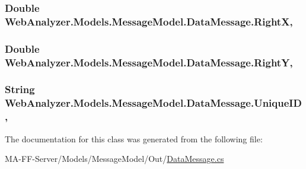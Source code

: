 \subsubsection[{Right\+X}]{\setlength{\rightskip}{0pt plus 5cm}Double Web\+Analyzer.\+Models.\+Message\+Model.\+Data\+Message.\+Right\+X\hspace{0.3cm}{\ttfamily [get]}, {\ttfamily [set]}}\label{class_web_analyzer_1_1_models_1_1_message_model_1_1_data_message_ab650b2ca778810b8a6fbd0d7530318a9}
\hypertarget{class_web_analyzer_1_1_models_1_1_message_model_1_1_data_message_a3b554f231e24414cfa625552ff2635df}{}
\subsubsection[{Right\+Y}]{\setlength{\rightskip}{0pt plus 5cm}Double Web\+Analyzer.\+Models.\+Message\+Model.\+Data\+Message.\+Right\+Y\hspace{0.3cm}{\ttfamily [get]}, {\ttfamily [set]}}\label{class_web_analyzer_1_1_models_1_1_message_model_1_1_data_message_a3b554f231e24414cfa625552ff2635df}
\hypertarget{class_web_analyzer_1_1_models_1_1_message_model_1_1_data_message_af8ea083fd4035d8c786f5da12bc01917}{}
\subsubsection[{Unique\+I\+D}]{\setlength{\rightskip}{0pt plus 5cm}String Web\+Analyzer.\+Models.\+Message\+Model.\+Data\+Message.\+Unique\+I\+D\hspace{0.3cm}{\ttfamily [get]}, {\ttfamily [set]}}\label{class_web_analyzer_1_1_models_1_1_message_model_1_1_data_message_af8ea083fd4035d8c786f5da12bc01917}


The documentation for this class was generated from the following file\+:\begin{DoxyCompactItemize}
\item 
M\+A-\/\+F\+F-\/\+Server/\+Models/\+Message\+Model/\+Out/\hyperlink{_data_message_8cs}{Data\+Message.\+cs}\end{DoxyCompactItemize}
